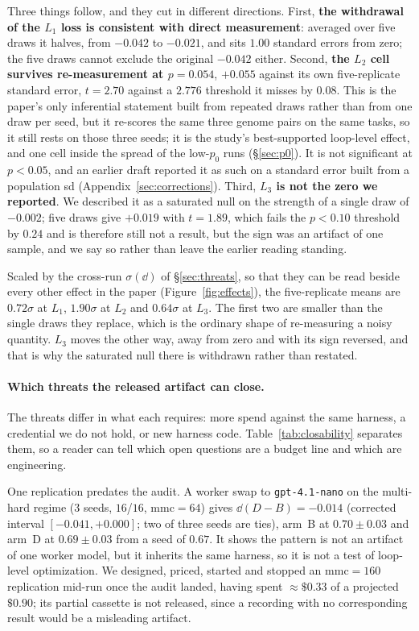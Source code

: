 \documentclass[11pt]{article}
\begin{document}
Three things follow, and they cut in different directions. First, \textbf{the withdrawal of the
$L_1$ loss is consistent with direct measurement}: averaged over five draws it halves, from
$-0.042$ to $-0.021$, and sits $1.00$ standard errors from zero; the five draws cannot exclude
the original $-0.042$ either. Second, \textbf{the $L_2$ cell survives re-measurement at
$p = 0.054$}, $+0.055$ against its own five-replicate standard error, $t = 2.70$
against a $2.776$ threshold it misses by $0.08$. This is the paper's only inferential statement
built from repeated draws rather than from one draw per seed, but it re-scores the same three
genome pairs on the same tasks, so it still rests on those three seeds; it is the study's
best-supported loop-level effect, and one cell inside the spread of the low-$p_0$ runs
(\S\ref{sec:p0}).
It is not significant at $p<0.05$, and an earlier draft reported it as such on a standard error
built from a population sd (Appendix~\ref{sec:corrections}). Third, \textbf{$L_3$ is not the zero we
reported}. We described it as a saturated null on the strength of a single draw of $-0.002$;
five draws give $+0.019$ with $t=1.89$, which fails the $p<0.10$ threshold by $0.24$ and is
therefore still not a result, but the sign was an artifact of one sample, and we say so
rather than leave the earlier reading standing.

Scaled by the cross-run $\sigma(\dd)$ of \S\ref{sec:threats}, so that they can be read beside every
other effect in the paper (Figure~\ref{fig:effects}), the five-replicate means are
$0.72\sigma$ at $L_1$, $1.90\sigma$ at $L_2$ and $0.64\sigma$ at $L_3$. The first two are smaller
than the single draws they replace, which is the ordinary shape of re-measuring a noisy quantity.
$L_3$ moves the other way, away from zero and with its sign reversed, and that is why the saturated
null there is withdrawn rather than restated.

\paragraph{Which threats the released artifact can close.} The threats differ in what each
requires: more spend against the same harness, a credential we do not hold, or new harness
code. Table~\ref{tab:closability} separates them, so a reader can tell which open questions
are a budget line and which are engineering.

One replication predates the audit. A worker swap to \texttt{gpt-4.1-nano} on the multi-hard
regime ($3$ seeds, $16$/$16$, $\mathrm{mmc}=64$) gives $\dd(D-B) = -0.014$ (corrected interval
$[-0.041,+0.000]$; two of three seeds are ties), arm~B at $0.70 \pm 0.03$ and arm~D at
$0.69 \pm 0.03$ from a seed of $0.67$. It shows the pattern is not an artifact of one worker
model, but it inherits the same harness, so it is not a test of loop-level optimization. We designed, priced, started and stopped an $\mathrm{mmc}{=}160$ replication mid-run once the audit landed, having spent $\approx\!\$0.33$ of a projected $\$0.90$; its partial cassette is
not released, since a recording with no corresponding result would be a misleading artifact.
\end{document}
